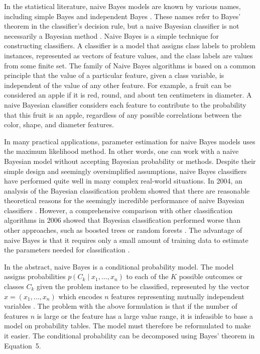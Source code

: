 \documentclass[preprint,12pt]{elsarticle}
\begin{document}
In the statistical literature, naive Bayes models are known by various names, including simple Bayes and independent Bayes \cite{Hand2001}. These names refer to Bayes' theorem in the classifier's decision rule, but a naive Bayesian classifier is not necessarily a Bayesian method \cite{Russell1999, Hand2001}. Naive Bayes is a simple technique for constructing classifiers. A classifier is a model that assigns class labels to problem instances, represented as vectors of feature values, and the class labels are values from some finite set. The family of Naive Bayes algorithms is based on a common principle that the value of a particular feature, given a class variable, is independent of the value of any other feature. For example, a fruit can be considered an apple if it is red, round, and about ten centimeters in diameter. A naive Bayesian classifier considers each feature to contribute to the probability that this fruit is an apple, regardless of any possible correlations between the color, shape, and diameter features.

In many practical applications, parameter estimation for naive Bayes models uses the maximum likelihood method. In other words, one can work with a naive Bayesian model without accepting Bayesian probability or methods. Despite their simple design and seemingly oversimplified assumptions, naive Bayes classifiers have performed quite well in many complex real-world situations. In 2004, an analysis of the Bayesian classification problem showed that there are reasonable theoretical reasons for the seemingly incredible performance of naive Bayesian classifiers \cite{Zhang2004}. However, a comprehensive comparison with other classification algorithms in 2006 showed that Bayesian classification performed worse than other approaches, such as boosted trees or random forests \cite{Caruana2006}. The advantage of naive Bayes is that it requires only a small amount of training data to estimate the parameters needed for classification \cite{stackexchange}.

In the abstract, naive Bayes is a conditional probability model. The model assigns probabilities $p(C_{k}\mid x_{1},\ldots, x_{n})$ to each of the $K$ possible outcomes or classes $C_{k}$ given the problem instance to be classified, represented by the vector $x = (x_{1},\ldots, x_{n})$ which encodes $n$ features representing mutually independent variables \cite{Murty2011}. The problem with the above formulation is that if the number of features $n$ is large or the feature has a large value range, it is infeasible to base a model on probability tables. The model must therefore be reformulated to make it easier. The conditional probability can be decomposed using Bayes' theorem in Equation~5.
\end{document}
